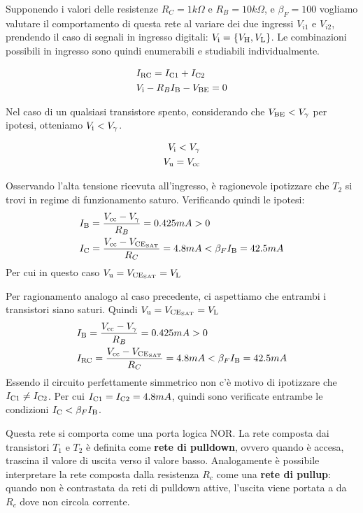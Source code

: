 \documentclass[../template]{subfiles}
\begin{document}
Supponendo i valori delle resistenze $R_C = 1k\Omega$ e $R_B = 10k\Omega$, e $\beta_F = 100$
vogliamo valutare il comportamento di questa rete al variare dei due ingressi $V_{i1}$ e $V_{i2}$, prendendo il caso di segnali in ingresso digitali:
$V_{\text{i}} = \{V_{\text{H}}, V_{\text{L}}\}$.
Le combinazioni possibili in ingresso sono quindi enumerabili e studiabili individualmente.
\begin{tcolorbox}[title=Equazioni Generali]
    \begin{align*}
        &I_{\text{RC}} = I_{\text{C1}} + I_{\text{C2}}\\
        &V_{\text{i}} - R_B I_{\text{B}} - V_{\text{BE}} = 0
    \end{align*}
\end{tcolorbox}
Nel caso di un qualsiasi transistore spento, considerando che $V_{\text{BE}} < V_\gamma$ per ipotesi, otteniamo $V_{\text{i}} < V_\gamma$.
\begin{tcolorbox}[title={Per ${\vi}_1 = {\vi}_2 = \vl$}]
    \begin{align*}
        V_{\text{i}} < V_\gamma\\
        V_{\text{u}} = V_{\text{cc}}
    \end{align*}
\end{tcolorbox}
\begin{tcolorbox}[title={Per ${\vi}_1 \vl, {\vi}_2 = \vh$}]
    Osservando l'alta tensione ricevuta all'ingresso, è ragionevole ipotizzare che $T_2$ si trovi in regime di funzionamento saturo.
    Verificando quindi le ipotesi:
    \begin{align*}
        &I_{\text{B}} = \frac{V_{\text{cc}} - V_\gamma}{R_B} = 0.425mA > 0\\
        &I_{\text{C}} = \frac{V_{\text{cc}} - V_{\text{CE}_{\text{SAT}}}}{R_C} = 4.8 mA < \beta_F I_{\text{B}} = 42.5mA\\
    \end{align*}
    Per cui in questo caso $V_{\text{u}} = V_{\text{CE}_{\text{SAT}}} = V_{\text{L}}$
\end{tcolorbox}
\begin{tcolorbox}[title={Per ${\vi}_1 = {\vi}_2 = \vh$}]
    Per ragionamento analogo al caso precedente, ci aspettiamo che entrambi i transistori siano saturi. Quindi $V_{\text{u}} = V_{\text{CE}_{\text{SAT}}} = V_{\text{L}}$
    \begin{align*}
        &I_{\text{B}} = \frac{V_{\text{cc}} - V_\gamma}{R_B} = 0.425mA > 0\\
        &I_{\text{RC}} = \frac{V_{\text{cc}} - V_{\text{CE}_{\text{SAT}}}}{R_C} = 4.8 mA < \beta_F I_{\text{B}} = 42.5mA\\
    \end{align*}
    Essendo il circuito perfettamente simmetrico non c'è motivo di ipotizzare che $I_{\text{C1}} \neq I_{\text{C2}}$. Per cui $I_{\text{C1}} = I_{\text{C2}} = 4.8mA$,
    quindi sono verificate entrambe le condizioni $I_{\text{C}} < \beta_F I_{\text{B}}$.
\end{tcolorbox}
Questa rete si comporta come una porta logica NOR.
La rete composta dai transistori $T_1$ e $T_2$ è definita come \textbf{rete di pulldown}, ovvero quando è accesa, trascina il valore di uscita verso il valore basso.
Analogamente è possibile interpretare la rete composta dalla resistenza $R_c$ come una \textbf{rete di pullup}: quando non è contrastata da reti di pulldown attive, l'uscita viene portata a \vh da $R_c$ dove non circola corrente.
\end{document}
